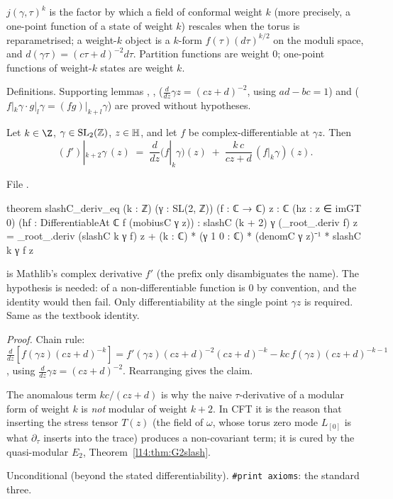 \begin{physics}
$j(\gamma,\tau)^k$ is the factor by which a field of conformal weight $k$ (more precisely, a one-point function of a state
of weight $k$) rescales when the torus is reparametrised; a weight-$k$ object is a $k$-form $f(\tau)(d\tau)^{k/2}$ on the
moduli space, and $d(\gamma\tau) = (c\tau+d)^{-2}d\tau$. Partition functions are weight $0$; one-point functions of weight-$k$
states are weight $k$.
\end{physics}
\begin{status}
Definitions. Supporting lemmas , , 
($\frac{d}{dz}\gamma z = (cz+d)^{-2}$, using $ad-bc=1$) and 
($f|_{k}\gamma\cdot g|_l\gamma = (fg)|_{k+l}\gamma$) are proved without hypotheses.
\end{status}

\begin{theorem}\label{l14:thm:slashderiv}
Let $k\in\Z$, $\gamma\in\mathrm{SL}_2(\mathbb{Z})$, $z\in\mathbb{H}$, and let $f$ be complex-differentiable at $\gamma z$. Then
\begin{equation*}
  (f')|_{k+2}\gamma\,(z) \;=\; \frac{d}{dz}\bigl(f|_k\gamma\bigr)(z) \;+\; \frac{k\,c}{cz+d}\,(f|_k\gamma)(z).
\end{equation*}
\end{theorem}
\noindent File .
\begin{leancode}
theorem slashC_deriv_eq (k : ℤ) (γ : SL(2, ℤ)) (f : ℂ → ℂ) {z : ℂ} (hz : z ∈ imGT 0)
    (hf : DifferentiableAt ℂ f (mobiusC γ z)) :
    slashC (k + 2) γ (_root_.deriv f) z
      = _root_.deriv (slashC k γ f) z
        + (k : ℂ) * (γ 1 0 : ℂ) * (denomC γ z)⁻¹ * slashC k γ f z
\end{leancode}
\begin{dictionary}
 is Mathlib's complex derivative $f'$ (the prefix  only disambiguates the name). The
hypothesis  is needed:  of a non-differentiable function is $0$ by convention, and the identity would
then fail. Only differentiability at the single point $\gamma z$ is required. Same as the textbook identity.
\end{dictionary}
\noindent\emph{Proof.} Chain rule: $\frac{d}{dz}[f(\gamma z)(cz+d)^{-k}] = f'(\gamma z)(cz+d)^{-2}(cz+d)^{-k} -
kc\,f(\gamma z)(cz+d)^{-k-1}$, using $\frac{d}{dz}\gamma z = (cz+d)^{-2}$. Rearranging gives the claim.
\begin{physics}
The anomalous term $kc/(cz+d)$ is why the naive $\tau$-derivative of a modular form of weight $k$ is \emph{not} modular of
weight $k+2$. In CFT it is the reason that inserting the stress tensor $T(z)$ (the field of $\omega$, whose torus zero mode $L_{[0]}$ is what $\partial_\tau$ inserts
into the trace) produces a non-covariant term; it is cured by the quasi-modular $E_2$, Theorem~\ref{l14:thm:G2slash}.
\end{physics}
\begin{status}
Unconditional (beyond the stated differentiability). \texttt{\#print axioms}: the standard three.
\end{status}


